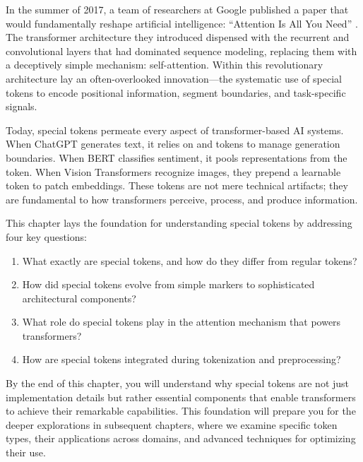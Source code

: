 In the summer of 2017, a team of researchers at Google published a paper that would fundamentally reshape artificial intelligence: ``Attention Is All You Need'' \citep{vaswani2017attention}. The transformer architecture they introduced dispensed with the recurrent and convolutional layers that had dominated sequence modeling, replacing them with a deceptively simple mechanism: self-attention. Within this revolutionary architecture lay an often-overlooked innovation---the systematic use of special tokens to encode positional information, segment boundaries, and task-specific signals.

Today, special tokens permeate every aspect of transformer-based AI systems. When ChatGPT generates text, it relies on \sos{} and \eos{} tokens to manage generation boundaries. When BERT classifies sentiment, it pools representations from the \cls{} token. When Vision Transformers recognize images, they prepend a learnable \cls{} token to patch embeddings. These tokens are not mere technical artifacts; they are fundamental to how transformers perceive, process, and produce information.

This chapter lays the foundation for understanding special tokens by addressing four key questions:
\begin{enumerate}
\item What exactly are special tokens, and how do they differ from regular tokens?
\item How did special tokens evolve from simple markers to sophisticated architectural components?
\item What role do special tokens play in the attention mechanism that powers transformers?
\item How are special tokens integrated during tokenization and preprocessing?
\end{enumerate}

By the end of this chapter, you will understand why special tokens are not just implementation details but rather essential components that enable transformers to achieve their remarkable capabilities. This foundation will prepare you for the deeper explorations in subsequent chapters, where we examine specific token types, their applications across domains, and advanced techniques for optimizing their use.